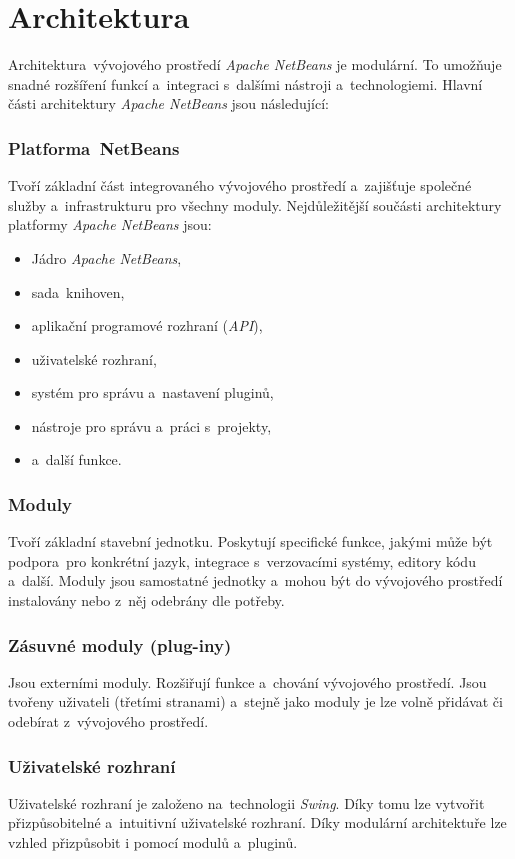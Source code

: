 \section{Architektura}
Architektura~vývojového prostředí \emph{Apache NetBeans} je modulární. To umožňuje snadné rozšíření funkcí a~integraci s~dalšími nástroji a~technologiemi.
Hlavní části architektury \emph{Apache NetBeans} jsou následující:

\subsubsection{Platforma~NetBeans}
Tvoří základní část integrovaného vývojového prostředí a~zajišťuje společné služby a~infrastrukturu pro všechny moduly. Nejdůležitější součásti architektury platformy \emph{Apache NetBeans} jsou:
\begin{itemize}
    \item Jádro \emph{Apache NetBeans},
    \item sada~knihoven,
    \item aplikační programové rozhraní (\emph{API}),
    \item uživatelské rozhraní,
    \item systém pro správu a~nastavení pluginů,
    \item nástroje pro správu a~práci s~projekty,
    \item a~další funkce.
\end{itemize}

\subsubsection{Moduly}
Tvoří základní stavební jednotku. Poskytují specifické funkce, jakými může být podpora~pro konkrétní jazyk, integrace s~verzovacími systémy, editory kódu a~další. Moduly jsou samostatné jednotky a~mohou být do vývojového prostředí instalovány nebo z~něj odebrány dle potřeby.

\subsubsection{Zásuvné moduly (plug-iny)}
Jsou externími moduly. Rozšiřují funkce a~chování vývojového prostředí. Jsou tvořeny uživateli (třetími stranami) a~stejně jako moduly je lze volně přidávat či odebírat z~vývojového prostředí.

\subsubsection{Uživatelské rozhraní}
Uživatelské rozhraní je založeno na~technologii \emph{Swing}. Díky tomu lze vytvořit přizpůsobitelné a~intuitivní uživatelské rozhraní. Díky modulární architektuře lze vzhled přizpůsobit i pomocí modulů a~pluginů.

